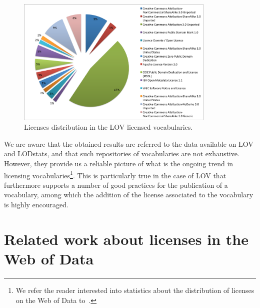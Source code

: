 \begin{figure}
\centering
\includegraphics[width=9.5cm]{img/LOV-stats.pdf}
\caption{Licenses distribution in the LOV licensed vocabularies.}
\label{fig:LOVstats}
\end{figure}

We are aware that the obtained results are referred to the data available on LOV and LODstats, and that such repositories of vocabularies are not exhaustive. However, they provide us a reliable picture of what is the ongoing trend in licensing vocabularies\footnote{We refer the reader interested into statistics about the distribution of licenses on the Web of Data to~\cite{DBLP:conf/semweb/Rodriguez-DoncelGM13,DBLP:conf/semweb/GovernatoriRVG13}.}. This is particularly true in the case of LOV that furthermore supports a number of good practices for the publication of a vocabulary, among which the addition of the license associated to the vocabulary is highly encouraged.

\section{Related work about licenses in the Web of Data}

